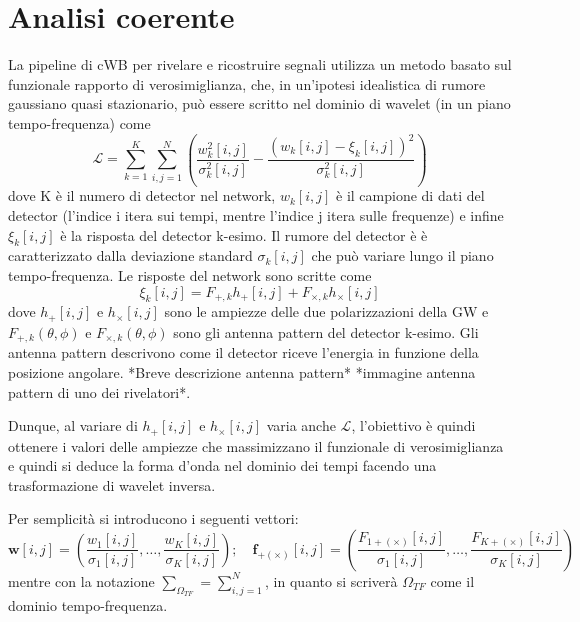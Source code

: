 \section{Analisi coerente}
\label{section:coherent_analysis}
La pipeline di cWB per rivelare e ricostruire segnali utilizza un metodo basato sul funzionale rapporto di verosimiglianza, che, in un'ipotesi idealistica di rumore gaussiano quasi stazionario, può essere scritto nel dominio di wavelet (in un piano tempo-frequenza) come
\begin{equation}
	\mathcal{L} = \sum_{k=1}^{K}\sum_{i,j=1}^{N}\left(\frac{w_k^2[i,j]}{\sigma_k^2[i,j]} - \frac{(w_k[i,j]-\xi_k[i,j])^2}{\sigma_k^2[i,j]}  \right)
	\label{eqn:Likelihood}
\end{equation}
dove K è il numero di detector nel network, $w_k[i,j]$ è il campione di dati del detector (l'indice i itera sui tempi, mentre l'indice j itera sulle frequenze) e infine $\xi_k[i,j]$ è la risposta del detector k-esimo.
Il rumore del detector è è caratterizzato dalla deviazione standard $\sigma_k[i,j]$ che può variare lungo il piano tempo-frequenza.
Le risposte del network sono scritte come
\begin{equation}
	\xi_k[i,j] = F_{+,k}h_+[i,j] + F_{\times,k}h_\times[i,j]
	\label{eqn:detector_response}
\end{equation}
dove $h_{+}[i,j]$ e $h_{\times}[i,j]$ sono le ampiezze delle due polarizzazioni della GW e $F_{+,k}(\theta,\phi)$ e $F_{\times,k}(\theta,\phi)$ sono gli antenna pattern del detector k-esimo\cite{Klimenko_2008}. Gli antenna pattern descrivono come il detector riceve l'energia in funzione della posizione angolare. *Breve descrizione antenna pattern* *immagine antenna pattern di uno dei rivelatori*\cite{Schutz_2011}.

Dunque, al variare di $h_{+}[i,j]$ e $h_{\times}[i,j]$ varia anche $\mathcal{L}$, l'obiettivo è quindi ottenere i valori delle ampiezze che massimizzano il funzionale di verosimiglianza e quindi si deduce la forma d'onda nel dominio dei tempi facendo una trasformazione di wavelet inversa.%

Per semplicità si introducono i seguenti vettori:
\[
	\textbf{w}[i,j] = \left(\frac{w_1[i,j]}{\sigma_1[i,j]},\dots, \frac{w_K[i,j]}{\sigma_K[i,j]} \right) ;
	\quad
	\textbf{f}_{+(\times)}[i,j] = \left(\frac{F_{1+(\times)}[i,j]}{\sigma_1[i,j]},\dots, \frac{F_{K+(\times)}[i,j]}{\sigma_K[i,j]} \right) 
\]
mentre con la notazione $\sum_{\Omega_{TF}} = \sum_{i,j=1}^N$, in quanto si scriverà $\Omega_{TF}$ come il dominio tempo-frequenza. 

